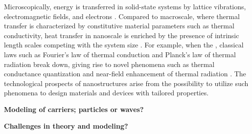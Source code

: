 Microscopically, energy is transferred in solid-state systems by lattice vibrations, electromagnetic fields, and electrons \cite{chen}. Compared to macroscale, where thermal transfer is characterized by constitutive material parameters such as thermal conductivity, heat transfer in nanoscale is enriched by the presence of intrinsic length scales competing with the system size \cite{chen}. For example, when the , classical laws such as Fourier's law of thermal conduction \cite{fourier} and Planck's law of thermal radiation \cite{planck00a} break down, giving rise to novel phenomena such as thermal conductance quantization \cite{rego98,angelescu98,schwab00} and near-field enhancement of thermal radiation \cite{volokitin07}. The technological prospects of nanostructures arise from the possibility to utilize such phenomena to design materials and devices with tailored properties. %

\textbf{Modeling of carriers; particles or waves?}

\textbf{Challenges in theory and modeling?}
 


